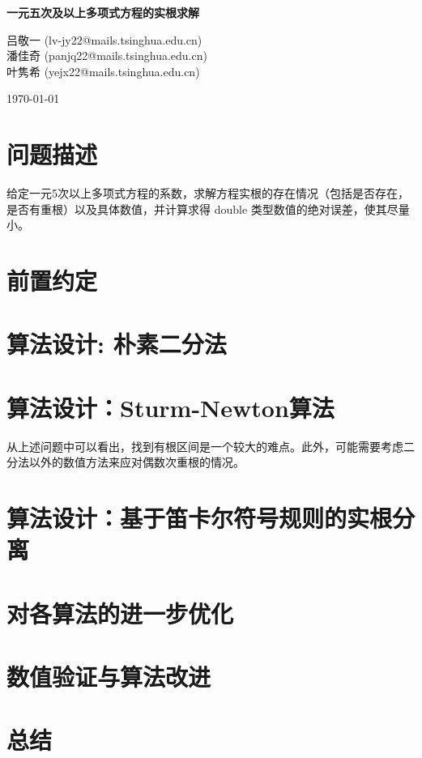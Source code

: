 \documentclass{ctexart}
\begin{document}
	
	\begin{titlepage}
    
    \centering
    \vspace*{\fill}
    
    \vspace*{0.5cm}
    
    \huge\bfseries
    一元五次及以上多项式方程的实根求解
    
	\vspace*{0.5cm}
	
	\large 吕敬一 (lv-jy22@mails.tsinghua.edu.cn) \\ 潘佳奇 (panjq22@mails.tsinghua.edu.cn) \\ 叶隽希 (yejx22@mails.tsinghua.edu.cn)
	
	\today
	
	\vspace*{\fill}
	
	\end{titlepage}

    \tableofcontents
    \clearpage

	\section{问题描述}
		给定一元5次以上多项式方程的系数，求解方程实根的存在情况（包括是否存在，是否有重根）以及具体数值，并计算求得 double 类型数值的绝对误差，使其尽量小。

	\section{前置约定}

	

	\section{算法设计: 朴素二分法}
	
	
	
	\section{算法设计：Sturm-Newton算法}
	
	从上述问题中可以看出，找到有根区间是一个较大的难点。此外，可能需要考虑二分法以外的数值方法来应对偶数次重根的情况。
	
	
	
	\section{算法设计：基于笛卡尔符号规则的实根分离}
	
	

	\section{对各算法的进一步优化}
	
	

	\section{数值验证与算法改进}
	
	

	\section{总结}
	
	
\end{document}
